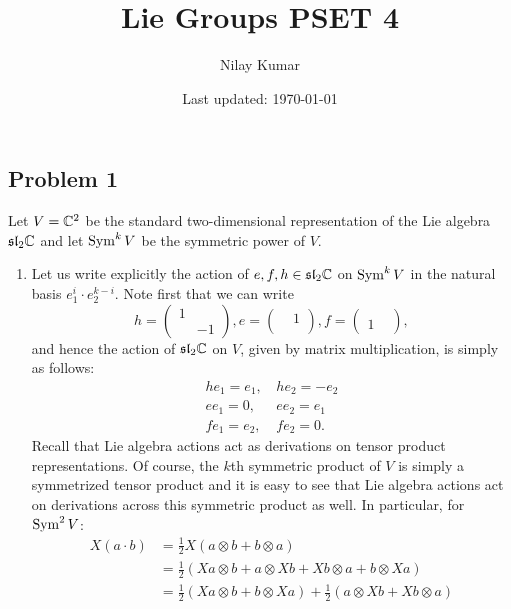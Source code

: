 \documentclass{../../mathnotes}
\title{Lie Groups PSET 4}
\author{Nilay Kumar}
\date{Last updated: \today}
\begin{document}
\maketitle

\subsection*{Problem 1}

Let $V=\mathbb{C}^2$ be the standard two-dimensional representation of the Lie algebra $\mathfrak{sl}_2\mathbb{C}$ and let $\operatorname{Sym}^kV$ be the symmetric power of $V$.
\begin{enumerate}
    \item Let us write explicitly the action of $e,f,h\in\mathfrak{sl}_2\mathbb{C}$ on $\operatorname{Sym}^kV$ in the natural basis $e_1^i\cdot e_2^{k-i}$.
        Note first that we can write
        \[
            h=\begin{pmatrix}
                1&\\&-1
            \end{pmatrix},
            e=\begin{pmatrix}
                &1\\&
            \end{pmatrix},
            f=\begin{pmatrix}
                &\\1&
            \end{pmatrix},
        \]
        and hence the action of $\mathfrak{sl}_2\mathbb{C}$ on $V$, given by matrix multiplication, is simply as follows:
        \begin{align*}
            he_1=e_1,&\, he_2=-e_2\\
            ee_1=0,&\, ee_2=e_1\\
            fe_1=e_2,&\, fe_2=0.
        \end{align*}
        Recall that Lie algebra actions act as derivations
        on tensor product representations. Of course, the $k$th symmetric product of $V$ is simply a symmetrized tensor product and it is easy
        to see that Lie algebra actions act on derivations across this symmetric product as well. In particular, for $\operatorname{Sym}^2V$:
        \begin{align*}
            X(a\cdot b)&=\frac{1}{2}X(a\otimes b+b\otimes a)\\
            &=\frac{1}{2}(Xa\otimes b+a\otimes Xb+Xb\otimes a+b\otimes Xa)\\
            &=\frac{1}{2}(Xa\otimes b+b\otimes Xa)+\frac{1}{2}(a\otimes Xb+Xb\otimes a)\\

\end{align*}
\end{enumerate}
\end{document}
